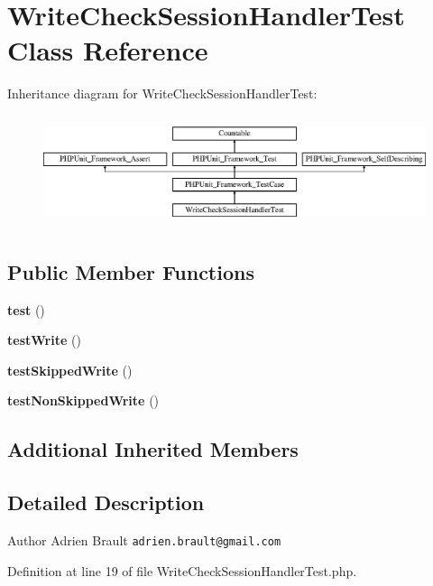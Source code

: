 \section{Write\+Check\+Session\+Handler\+Test Class Reference}
\label{class_symfony_1_1_component_1_1_http_foundation_1_1_tests_1_1_session_1_1_storage_1_1_handler_1_1764a0265b115b3920ce02bf4ef906bb}
Inheritance diagram for Write\+Check\+Session\+Handler\+Test\+:\begin{figure}[H]
\begin{center}
\leavevmode
\includegraphics[height=3.303835cm]{class_symfony_1_1_component_1_1_http_foundation_1_1_tests_1_1_session_1_1_storage_1_1_handler_1_1764a0265b115b3920ce02bf4ef906bb}
\end{center}
\end{figure}
\subsection*{Public Member Functions}
\begin{DoxyCompactItemize}
\item 
{\bf test} ()
\item 
{\bf test\+Write} ()
\item 
{\bf test\+Skipped\+Write} ()
\item 
{\bf test\+Non\+Skipped\+Write} ()
\end{DoxyCompactItemize}
\subsection*{Additional Inherited Members}


\subsection{Detailed Description}
\begin{DoxyAuthor}{Author}
Adrien Brault {\tt adrien.\+brault@gmail.\+com} 
\end{DoxyAuthor}


Definition at line 19 of file Write\+Check\+Session\+Handler\+Test.\+php.



